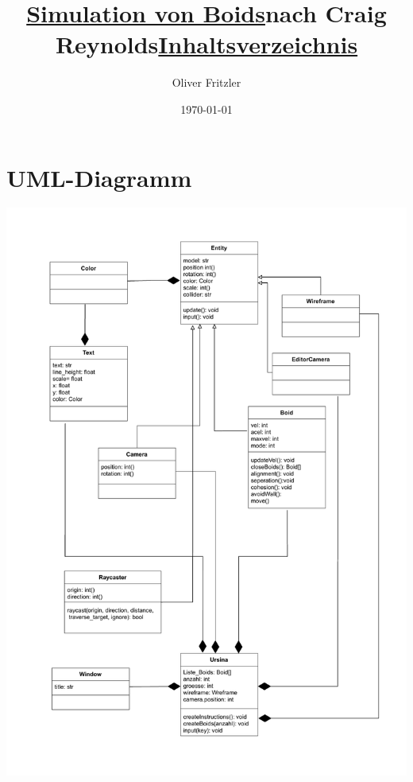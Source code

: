 \documentclass[a4paper, hidelinks, 12pt]{article}
\begin{document}
	
\begin{titlepage}
\title{\Large{\textbf{\underline{Simulation von Boids}}}\linebreak\large\textbf{nach Craig Reynolds}}
\author{Oliver Fritzler}
\date{\today}
\maketitle
\end{titlepage}

\title{\Large{\textbf{\underline{Inhaltsverzeichnis}}}}
\fontsize{11}{0}
\tableofcontents
\fontsize{12}{0}
\section{UML-Diagramm}
\includegraphics[scale=0.75, page=1]{UML/Boids_UML.pdf}
\newpage
\end{document}
